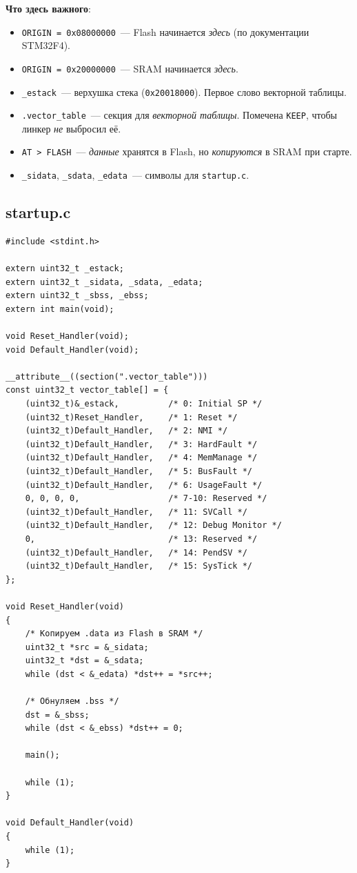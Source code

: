 \textbf{Что здесь важного}:

\begin{itemize}
    \item \texttt{ORIGIN = 0x08000000}~--- Flash начинается
          \emph{здесь} (по документации STM32F4).
    \item \texttt{ORIGIN = 0x20000000}~--- SRAM начинается
          \emph{здесь}.
    \item \texttt{\_estack}~--- верхушка стека (\texttt{0x20018000}).
          Первое слово векторной таблицы.
    \item \texttt{.vector\_table}~--- секция для \emph{векторной
          таблицы}. Помечена \texttt{KEEP}, чтобы линкер
          \emph{не} выбросил её.
    \item \texttt{AT > FLASH}~--- \emph{данные} хранятся
          в Flash, но \emph{копируются} в SRAM при старте.
    \item \texttt{\_sidata}, \texttt{\_sdata}, \texttt{\_edata}~---
          символы для \texttt{startup.c}.
\end{itemize}

\subsection{startup.c}

\begin{listing}[htbp]
\begin{verbatim}
#include <stdint.h>

extern uint32_t _estack;
extern uint32_t _sidata, _sdata, _edata;
extern uint32_t _sbss, _ebss;
extern int main(void);

void Reset_Handler(void);
void Default_Handler(void);

__attribute__((section(".vector_table")))
const uint32_t vector_table[] = {
    (uint32_t)&_estack,          /* 0: Initial SP */
    (uint32_t)Reset_Handler,     /* 1: Reset */
    (uint32_t)Default_Handler,   /* 2: NMI */
    (uint32_t)Default_Handler,   /* 3: HardFault */
    (uint32_t)Default_Handler,   /* 4: MemManage */
    (uint32_t)Default_Handler,   /* 5: BusFault */
    (uint32_t)Default_Handler,   /* 6: UsageFault */
    0, 0, 0, 0,                  /* 7-10: Reserved */
    (uint32_t)Default_Handler,   /* 11: SVCall */
    (uint32_t)Default_Handler,   /* 12: Debug Monitor */
    0,                           /* 13: Reserved */
    (uint32_t)Default_Handler,   /* 14: PendSV */
    (uint32_t)Default_Handler,   /* 15: SysTick */
};

void Reset_Handler(void)
{
    /* Копируем .data из Flash в SRAM */
    uint32_t *src = &_sidata;
    uint32_t *dst = &_sdata;
    while (dst < &_edata) *dst++ = *src++;

    /* Обнуляем .bss */
    dst = &_sbss;
    while (dst < &_ebss) *dst++ = 0;

    main();

    while (1);
}

void Default_Handler(void)
{
    while (1);
}
\end{verbatim}
\caption{\texttt{startup.c}~--- векторная таблица и обработчик сброса}
\label{lst:flashing-startup}
\end{listing}

